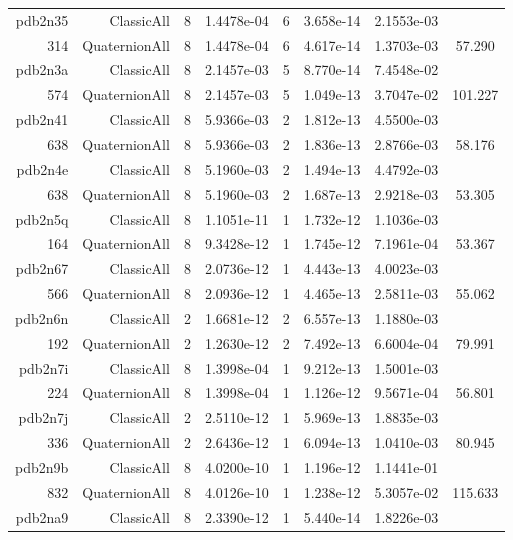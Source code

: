 \begin{xltabular}{\textwidth}{r|rcS[table-format=1.4e+2]cS[table-format=1.3e+2]S[table-format=1.4e+2]S[table-format=-1.3]}
pdb2n35 & ClassicAll & 8 & 1.4478e-04 & 6 & 3.658e-14 & 2.1553e-03 & \\
314 & QuaternionAll & 8 & 1.4478e-04 & 6 & 4.617e-14 & 1.3703e-03 & 57.290\\  \addlinespace
pdb2n3a & ClassicAll & 8 & 2.1457e-03 & 5 & 8.770e-14 & 7.4548e-02 & \\
574 & QuaternionAll & 8 & 2.1457e-03 & 5 & 1.049e-13 & 3.7047e-02 & 101.227\\  \addlinespace
pdb2n41 & ClassicAll & 8 & 5.9366e-03 & 2 & 1.812e-13 & 4.5500e-03 & \\
638 & QuaternionAll & 8 & 5.9366e-03 & 2 & 1.836e-13 & 2.8766e-03 & 58.176\\  \addlinespace
pdb2n4e & ClassicAll & 8 & 5.1960e-03 & 2 & 1.494e-13 & 4.4792e-03 & \\
638 & QuaternionAll & 8 & 5.1960e-03 & 2 & 1.687e-13 & 2.9218e-03 & 53.305\\  \addlinespace
pdb2n5q & ClassicAll & 8 & 1.1051e-11 & 1 & 1.732e-12 & 1.1036e-03 & \\
164 & QuaternionAll & 8 & 9.3428e-12 & 1 & 1.745e-12 & 7.1961e-04 & 53.367\\  \addlinespace
pdb2n67 & ClassicAll & 8 & 2.0736e-12 & 1 & 4.443e-13 & 4.0023e-03 & \\
566 & QuaternionAll & 8 & 2.0936e-12 & 1 & 4.465e-13 & 2.5811e-03 & 55.062\\  \addlinespace
pdb2n6n & ClassicAll & 2 & 1.6681e-12 & 2 & 6.557e-13 & 1.1880e-03 & \\
192 & QuaternionAll & 2 & 1.2630e-12 & 2 & 7.492e-13 & 6.6004e-04 & 79.991\\  \addlinespace
pdb2n7i & ClassicAll & 8 & 1.3998e-04 & 1 & 9.212e-13 & 1.5001e-03 & \\
224 & QuaternionAll & 8 & 1.3998e-04 & 1 & 1.126e-12 & 9.5671e-04 & 56.801\\  \addlinespace
pdb2n7j & ClassicAll & 2 & 2.5110e-12 & 1 & 5.969e-13 & 1.8835e-03 & \\
336 & QuaternionAll & 2 & 2.6436e-12 & 1 & 6.094e-13 & 1.0410e-03 & 80.945\\  \addlinespace
pdb2n9b & ClassicAll & 8 & 4.0200e-10 & 1 & 1.196e-12 & 1.1441e-01 & \\
832 & QuaternionAll & 8 & 4.0126e-10 & 1 & 1.238e-12 & 5.3057e-02 & 115.633\\  \addlinespace
pdb2na9 & ClassicAll & 8 & 2.3390e-12 & 1 & 5.440e-14 & 1.8226e-03 & \\

\end{xltabular}

